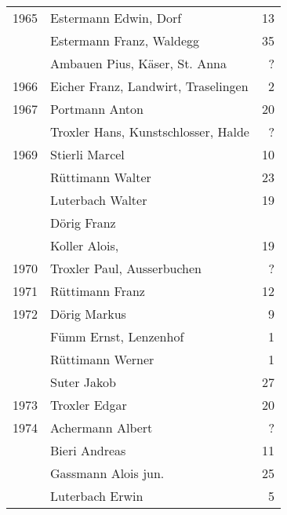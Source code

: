 {\begin{longtable}{ l l r }
        1965          & Estermann Edwin, Dorf                     & 13          \\
                      & Estermann Franz, Waldegg                  & 35          \\
                      & Ambauen Pius, Käser, St. Anna             & ?           \\
        1966          & Eicher Franz, Landwirt, Traselingen       & 2           \\
        1967          & Portmann Anton                            & 20          \\
                      & Troxler Hans, Kunstschlosser, Halde       & ?           \\
        1969          & Stierli Marcel                            & 10          \\
                      & Rüttimann Walter                          & 23          \\
                      & Luterbach Walter                          & 19          \\
                      & Dörig Franz                               &             \\
                      & Koller Alois,                             & 19          \\
        1970          & Troxler Paul, Ausserbuchen                & ?           \\
        1971          & Rüttimann Franz                           & 12          \\
        1972          & Dörig Markus                              & 9           \\
                      & Fümm Ernst, Lenzenhof                     & 1           \\
                      & Rüttimann Werner                          & 1           \\
                      & Suter Jakob                               & 27          \\
        1973          & Troxler Edgar                             & 20          \\
        1974          & Achermann Albert                          & ?           \\
                      & Bieri Andreas                             & 11          \\
                      & Gassmann Alois jun.                       & 25          \\
                      & Luterbach Erwin                           & 5           \\

\end{longtable}}
